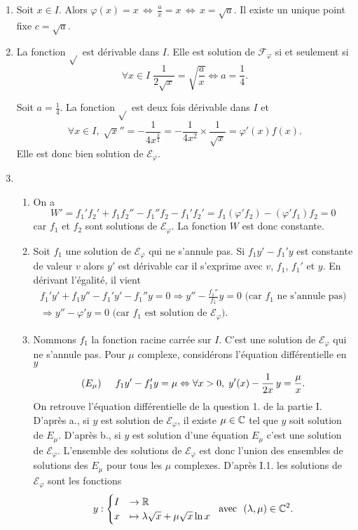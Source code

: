 \begin{enumerate}
\item Soit $x\in I$. Alors $\varphi(x)=x \, \Leftrightarrow \, \frac ax=x \, \Leftrightarrow \, x=\sqrt{a}$.
Il existe un unique point fixe $c=\sqrt a$.
\item La fonction $ \sqrt{} $ est dérivable dans $I$. Elle est solution de $\mathcal{F}_{\varphi}$ si et seulement si
\[
\forall x\in I\;  \frac{1}{2\sqrt{x}}=\sqrt{\frac ax} \Leftrightarrow a=\frac{1}{4}.  
\]

Soit $a=\frac 14$. La fonction  $\sqrt{}$ est deux fois dérivable dans $I$ et
\[
\forall x \in I, \; \sqrt{x}'' =-\frac 1{4x^{\frac 32}}=-\frac 1{4x^{2}}\times \frac 1{\sqrt x}=\varphi'(x)f(x).  
\]
Elle est donc bien solution de $\mathcal E_\varphi$.
\item 
\begin{enumerate}
\item On a 
\[
W' = f_1' f_2' + f_1f_2'' -f_1''f_2 - f_1'f_2'
    = f_1(\varphi'f_2)-(\varphi'f_1)f_2   = 0
\]
car $f_1$ et $f_2$ sont solutions de $\mathcal E_\varphi$. La fonction $W$ est donc constante.
\item Soit $f_1$ une solution de  $\mathcal E_\varphi$ qui ne s'annule pas. Si $f_1y'-f_1'y$ est constante de valeur $v$
alors $y'$ est dérivable car il s'exprime avec $v$, $f_1$, $f_1'$ et $y$.\newline
En dérivant l'égalité, il vient
\begin{multline*}
  f_1'y'+f_1y''-f_1'y'-f_1''y = 0
\Rightarrow y''-\frac{f_1''}{f_1}y = 0 \text{ (car $f_1$ ne s'annule pas)} \\
\Rightarrow y'' -\varphi'y = 0 \text{ (car $f_1$ est solution de $\mathcal E_\varphi$)}.
\end{multline*}

\item Nommons $f_1$ la fonction racine carrée sur $I$. C'est une solution de $\mathcal E_\varphi$ qui ne s'annule pas.\newline
Pour $\mu$ complexe, considérons l'équation différentielle en $y$ 
\[
(E_\mu) \hspace{0.5cm} f_1 y' - f_1' y = \mu \Leftrightarrow \forall x > 0, \; y'(x) - \frac{1}{2x}\,y = \frac{\mu}{x}.
\]
On retrouve l'équation différentielle de la question 1. de la partie I.\newline
D'après a., si $y$ est solution de $\mathcal{E}_\varphi$, il existe $\mu\in \mathbb{C}$ tel que $y$ soit solution de $E_\mu$.\newline
D'après b., si $y$ est solution d'une équation $E_\mu$ c'est une solution de $\mathcal{E}_\varphi$.\newline
L'ensemble des solutions de $\mathcal{E}_\varphi$ est donc l'union des ensembles de solutions des $E_\mu$ pour tous les $\mu$ complexes. \newline
D'après I.1. les solutions de $\mathcal E_\varphi$ sont les fonctions 
\[
y : \begin{cases}I &\rightarrow \mathbb{R} \\ x &\mapsto \lambda \sqrt x+\mu\sqrt x\ln x \end{cases}\; \text{ avec }\ (\lambda,\mu)\in\mathbb{C}^2.  
\]


\end{enumerate}
\end{enumerate}
